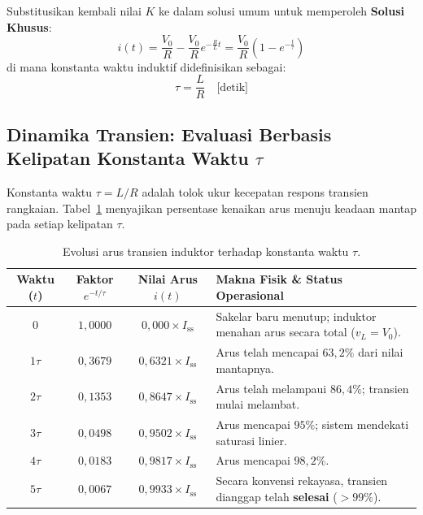\documentclass[11pt,a4paper]{article}
\theoremstyle{definition}
\begin{document}
Substitusikan kembali nilai $K$ ke dalam solusi umum untuk memperoleh \textbf{Solusi Khusus}:
\begin{equation}
    i(t) = \frac{V_0}{R} - \frac{V_0}{R} e^{-\frac{R}{L} t} = \frac{V_0}{R} \left( 1 - e^{-\frac{t}{\tau}} \right)
    \label{eq:particular_sol_rl}
\end{equation}
di mana konstanta waktu induktif didefinisikan sebagai:
\begin{equation}
    \tau = \frac{L}{R} \quad \text{[detik]}
    \label{eq:time_constant_rl}
\end{equation}

\subsection{Dinamika Transien: Evaluasi Berbasis Kelipatan Konstanta Waktu \texorpdfstring{$\tau$}{tau}}
Konstanta waktu $\tau = L/R$ adalah tolok ukur kecepatan respons transien rangkaian. Tabel~\ref{tab:transient_evolution} menyajikan persentase kenaikan arus menuju keadaan mantap pada setiap kelipatan $\tau$.

\begin{table}[htbp]
\centering
\caption{Evolusi arus transien induktor terhadap konstanta waktu $\tau$.}
\label{tab:transient_evolution}
\begin{tabularx}{\textwidth}{cccX}
\toprule
\textbf{Waktu ($t$)} & \textbf{Faktor $e^{-t/\tau}$} & \textbf{Nilai Arus $i(t)$} & \textbf{Makna Fisik \& Status Operasional} \\ \midrule
$0$ & $1{,}0000$ & $0{,}000 \times I_{\text{ss}}$ & Sakelar baru menutup; induktor menahan arus secara total ($v_L = V_0$). \\
$1\tau$ & $0{,}3679$ & $0{,}6321 \times I_{\text{ss}}$ & Arus telah mencapai $63{,}2\%$ dari nilai mantapnya. \\
$2\tau$ & $0{,}1353$ & $0{,}8647 \times I_{\text{ss}}$ & Arus telah melampaui $86{,}4\%$; transien mulai melambat. \\
$3\tau$ & $0{,}0498$ & $0{,}9502 \times I_{\text{ss}}$ & Arus mencapai $95\%$; sistem mendekati saturasi linier. \\
$4\tau$ & $0{,}0183$ & $0{,}9817 \times I_{\text{ss}}$ & Arus mencapai $98{,}2\%$. \\
$5\tau$ & $0{,}0067$ & $0{,}9933 \times I_{\text{ss}}$ & Secara konvensi rekayasa, transien dianggap telah \textbf{selesai} ($>99\%$). \\ \bottomrule
\end{tabularx}
\end{table}
\end{document}
